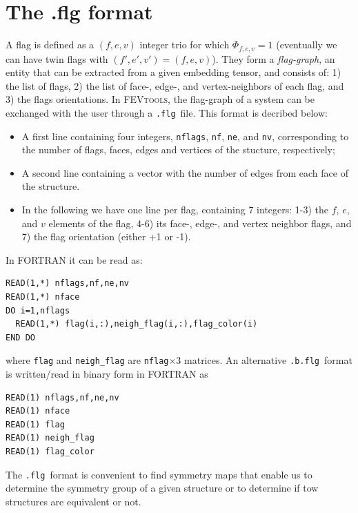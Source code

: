\documentclass{scrreprt}
\newcommand{\flg}{\texttt{.flg}}
\newcommand{\flgb}{\texttt{.b.flg}}
\begin{document}
\section{The .flg format}
A flag is defined as a $(f,e,v)$ integer trio for which $\Phi_{f,e,v}=1$ (eventually we can have twin flags with $(f',e',v')=(f,e,v)$). They form a \emph{flag-graph}, an entity that can be extracted from a given embedding tensor, and consists of: 1) the list of flags, 2) the list of face-, edge-, and vertex-neighbors of each flag, and 3) the flags orientations. In \textsc{FEVtools}, the flag-graph of a system can be exchanged with the user through a \flg~file. This format is decribed below:
\begin{itemize}
 \item A first line containing four integers, \verb-nflags-, \verb-nf-, \verb-ne-, and \verb-nv-, corresponding to the number of flags, faces, edges and vertices of the stucture, respectively;
 \item A second line containing a vector with the number of edges from each face of the structure.
 \item In the following we have one line per flag, containing 7 integers: 1-3) the $f$, $e$, and $v$ elements of the flag, 4-6) its face-, edge-, and vertex neighbor flags, and 7) the flag orientation (either +1 or -1).
\end{itemize}
In \textsc{FORTRAN} it can be read as: 
\begin{verbatim}
READ(1,*) nflags,nf,ne,nv
READ(1,*) nface
DO i=1,nflags
  READ(1,*) flag(i,:),neigh_flag(i,:),flag_color(i)
END DO 
\end{verbatim} 
where \verb-flag- and \verb-neigh_flag- are \verb-nflag-$\times$3 matrices. An alternative \flgb~format is written/read in binary form in \textsc{FORTRAN} as
\begin{verbatim}
READ(1) nflags,nf,ne,nv
READ(1) nface
READ(1) flag
READ(1) neigh_flag
READ(1) flag_color
\end{verbatim} 

The \flg~format is convenient to find symmetry maps that enable us to determine the symmetry group of a given structure or to determine if tow structures are equivalent or not.
\end{document}
